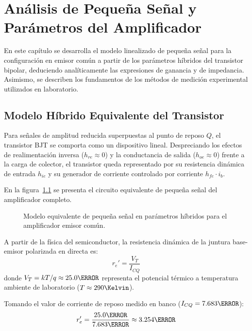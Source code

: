 \chapter{Análisis de Pequeña Señal y Parámetros del Amplificador}
\label{chap:pequena_senal}

En este capítulo se desarrolla el modelo linealizado de pequeña señal para la configuración en emisor común a partir
de los parámetros híbridos del transistor bipolar, deduciendo analíticamente las expresiones de ganancia y de
impedancia. Asimismo, se describen los fundamentos de los métodos de medición experimental utilizados en laboratorio.

\section{Modelo Híbrido Equivalente del Transistor}

Para señales de amplitud reducida superpuestas al punto de reposo $Q$, el transistor BJT se comporta como un
dispositivo lineal. Despreciando los efectos de realimentación inversa ($h_{re} \approx 0$) y la conductancia de
salida ($h_{oe} \approx 0$) frente a la carga de colector, el transistor queda representado por su resistencia
dinámica de entrada $h_{ie}$ y su generador de corriente controlado por corriente $h_{fe} \cdot i_b$.

En la figura~\ref{crkt:pequena_senal} se presenta el circuito equivalente de pequeña señal del amplificador completo.

\begin{figure}[!ht]
  \centering
  
  \caption{Modelo equivalente de pequeña señal en parámetros híbridos para el amplificador emisor común.}
  \label{crkt:pequena_senal}
\end{figure}

A partir de la física del semiconductor, la resistencia dinámica de la juntura base-emisor polarizada en directa es:
\begin{equation}
  r_e' = \frac{V_T}{I_{CQ}}
  \label{eq:re_prima}
\end{equation}
donde $V_T = k T / q \approx 25.0\mV$ representa el potencial térmico a temperatura ambiente de laboratorio ($T \approx 290\Kelvin$).

Tomando el valor de corriente de reposo medido en banco ($I_{CQ} = 7.683\mA$):
\begin{equation}
  r_e' = \frac{25.0\mV}{7.683\mA} \approx 3.254\ohm
\end{equation}

